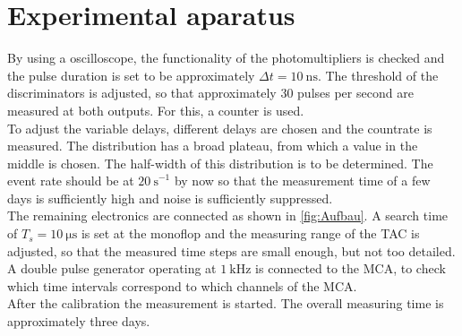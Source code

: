 \chapter{Experimental aparatus}
\label{cha:Durchführung}

By using a oscilloscope, the functionality of the photomultipliers is checked and the pulse duration is set to be approximately $\Delta t = \qty{10}{\nano\second}$. The threshold of the discriminators
is adjusted, so that approximately 30 pulses per second are measured at both outputs. For this, a counter is used.\\
To adjust the variable delays, different delays are chosen and the countrate is measured. The distribution has a broad plateau, from which a value
in the middle is chosen. The half-width of this distribution is to be determined. The event rate should be at $\qty{20}{\second}^{-1}$ by now so that the measurement time of a few days
is sufficiently high and noise is sufficiently suppressed.\\
The remaining electronics are connected as shown in \autoref{fig:Aufbau}. A search time of $T_s = \qty{10}{\micro\second}$ is set at the monoflop
and the measuring range of the TAC is adjusted, so that the measured time steps are small enough, but not too detailed.\\
A double pulse generator operating at $\qty{1}{\kilo\hertz}$ is connected to the MCA, to check which time intervals correspond to which channels of the
MCA. \\
After the calibration the measurement is started. The overall measuring time is approximately three days.